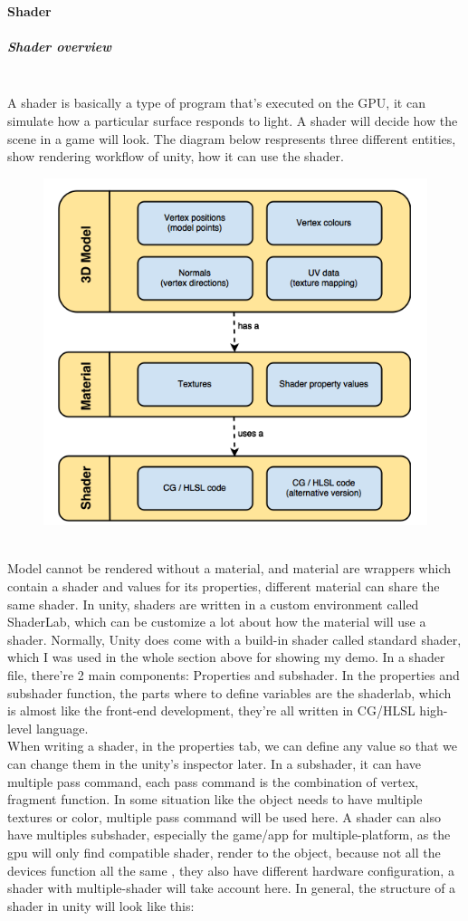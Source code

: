 \documentclass[a4paper, 13pt]{extarticle}
\begin{document}
{ \paragraph{Shader} \vspace{-0.2cm}
 \subparagraph{Shader overview} ~\\[0.1cm]
 A shader is basically a type of program that's executed on the GPU, it can simulate how a particular surface responds to light. A shader will decide how the scene in a game will look. The diagram below respresents three different entities, show rendering workflow of unity, how it can use the shader. 
 \begin{figure}[h]
 		\begin{minipage}{1\textwidth}
 			\centering
 			\includegraphics[width=0.45\linewidth]{intructions/Shader_workflow.png}
 			\centering
 		\end{minipage}
 \end{figure}
\\[0.01cm]
   Model cannot be rendered without a material, and material are wrappers which contain a shader and values for its properties, different material can share the same shader. In unity, shaders are written in a custom environment called ShaderLab, which can be customize a lot about how the material will use a shader. Normally, Unity does come with a build-in shader called standard shader, which I was used in the whole section above for showing my demo. In a shader file, there're 2 main components: Properties and subshader. In the properties and subshader function, the parts where to define variables are the shaderlab, which is almost like the front-end development, they're all written in CG/HLSL high-level language. \\
   When writing a shader, in the properties tab, we can define any value  so that we can change them in the unity's inspector later. In a subshader, it can have multiple pass command, each pass command is the combination of vertex, fragment function. In some situation like the object needs to have multiple textures or color, multiple pass command will be used here. A shader can also have multiples subshader, especially the game/app for multiple-platform, as the gpu will only find compatible shader, render to the object, because not all the devices function all the same , they also have different hardware configuration, a shader with multiple-shader will take account here. In general, the structure of a shader in unity will look like this: 
}
\end{document}
